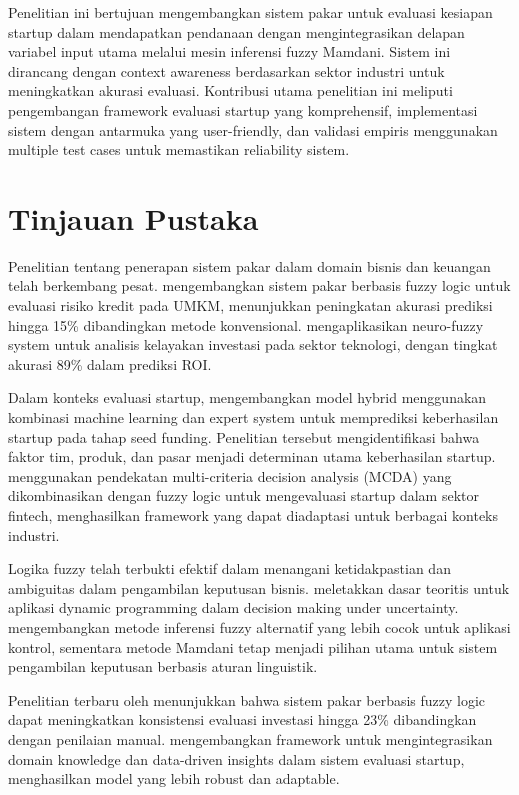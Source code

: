 \documentclass[12pt,a4paper]{article}
\begin{document}
Penelitian ini bertujuan mengembangkan sistem pakar untuk evaluasi kesiapan startup dalam mendapatkan pendanaan dengan mengintegrasikan delapan variabel input utama melalui mesin inferensi fuzzy Mamdani. Sistem ini dirancang dengan context awareness berdasarkan sektor industri untuk meningkatkan akurasi evaluasi. Kontribusi utama penelitian ini meliputi pengembangan framework evaluasi startup yang komprehensif, implementasi sistem dengan antarmuka yang user-friendly, dan validasi empiris menggunakan multiple test cases untuk memastikan reliability sistem.

\section{Tinjauan Pustaka}

Penelitian tentang penerapan sistem pakar dalam domain bisnis dan keuangan telah berkembang pesat. \citet{Kumar2023} mengembangkan sistem pakar berbasis fuzzy logic untuk evaluasi risiko kredit pada UMKM, menunjukkan peningkatan akurasi prediksi hingga 15\% dibandingkan metode konvensional. \citet{Zhang2022} mengaplikasikan neuro-fuzzy system untuk analisis kelayakan investasi pada sektor teknologi, dengan tingkat akurasi 89\% dalam prediksi ROI.

Dalam konteks evaluasi startup, \citet{Silva2023} mengembangkan model hybrid menggunakan kombinasi machine learning dan expert system untuk memprediksi keberhasilan startup pada tahap seed funding. Penelitian tersebut mengidentifikasi bahwa faktor tim, produk, dan pasar menjadi determinan utama keberhasilan startup. \citet{Anderson2022} menggunakan pendekatan multi-criteria decision analysis (MCDA) yang dikombinasikan dengan fuzzy logic untuk mengevaluasi startup dalam sektor fintech, menghasilkan framework yang dapat diadaptasi untuk berbagai konteks industri.

Logika fuzzy telah terbukti efektif dalam menangani ketidakpastian dan ambiguitas dalam pengambilan keputusan bisnis. \citet{Bellman1970} meletakkan dasar teoritis untuk aplikasi dynamic programming dalam decision making under uncertainty. \citet{Sugeno1985} mengembangkan metode inferensi fuzzy alternatif yang lebih cocok untuk aplikasi kontrol, sementara metode Mamdani tetap menjadi pilihan utama untuk sistem pengambilan keputusan berbasis aturan linguistik.

Penelitian terbaru oleh \citet{Wang2023} menunjukkan bahwa sistem pakar berbasis fuzzy logic dapat meningkatkan konsistensi evaluasi investasi hingga 23\% dibandingkan dengan penilaian manual. \citet{Lopez2022} mengembangkan framework untuk mengintegrasikan domain knowledge dan data-driven insights dalam sistem evaluasi startup, menghasilkan model yang lebih robust dan adaptable.
\end{document}
